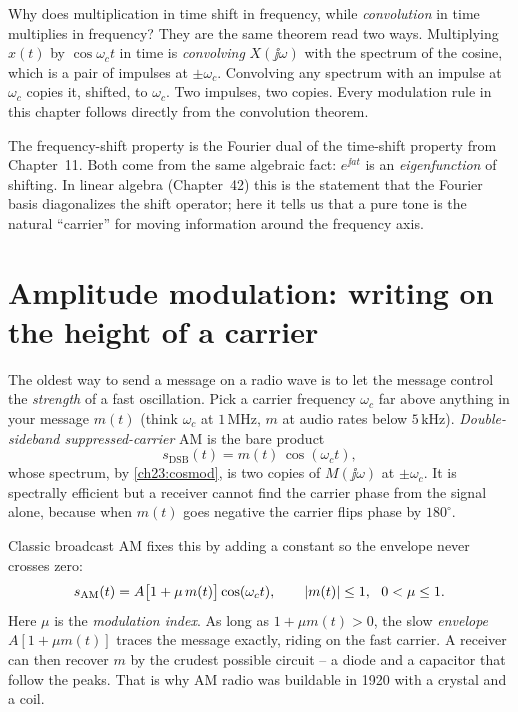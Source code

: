 \begin{whybox}
Why does multiplication in time shift in frequency, while \emph{convolution} in time
multiplies in frequency? They are the same theorem read two ways. Multiplying $x(t)$ by
$\cos\omega_c t$ in time is \emph{convolving} $X(\jj\omega)$ with the spectrum of the
cosine, which is a pair of impulses at $\pm\omega_c$. Convolving any spectrum with an
impulse at $\omega_c$ copies it, shifted, to $\omega_c$. Two impulses, two copies.
Every modulation rule in this chapter follows directly from the convolution theorem.
\end{whybox}

\begin{connectionbox}
The frequency-shift property is the Fourier dual of the time-shift property from
Chapter~11. Both come from the same algebraic fact: $e^{\jj a t}$ is an
\emph{eigenfunction} of shifting. In linear algebra (Chapter~42) this is the statement
that the Fourier basis diagonalizes the shift operator; here it tells us that a pure
tone is the natural ``carrier'' for moving information around the frequency axis.
\end{connectionbox}

\section{Amplitude modulation: writing on the height of a carrier}
\label{ch23:am}

The oldest way to send a message on a radio wave is to let the message control the
\emph{strength} of a fast oscillation. Pick a carrier frequency $\omega_c$ far above
anything in your message $m(t)$ (think $\omega_c$ at $1\,$MHz, $m$ at audio rates below
$5\,$kHz). \emph{Double-sideband suppressed-carrier} AM is the bare product
\begin{equation}
\label{ch23:dsbsc}
s_{\text{DSB}}(t) = m(t)\,\cos(\omega_c t),
\end{equation}
whose spectrum, by \eqref{ch23:cosmod}, is two copies of $M(\jj\omega)$ at $\pm\omega_c$.
It is spectrally efficient but a receiver cannot find the carrier phase from the signal
alone, because when $m(t)$ goes negative the carrier flips phase by $180^\circ$.

Classic broadcast AM fixes this by adding a constant so the envelope never crosses zero:
\begin{equation}
\label{ch23:am-eq}
s_{\text{AM}}(t) = A\big[1 + \mu\, m(t)\big]\cos(\omega_c t),
\qquad \lvert m(t)\rvert\le 1,\ \ 0<\mu\le 1.
\end{equation}
Here $\mu$ is the \emph{modulation index}. As long as $1+\mu m(t) > 0$, the slow
\emph{envelope} $A[1+\mu m(t)]$ traces the message exactly, riding on the fast carrier.
A receiver can then recover $m$ by the crudest possible circuit -- a diode and a
capacitor that follow the peaks. That is why AM radio was buildable in 1920 with a
crystal and a coil.

